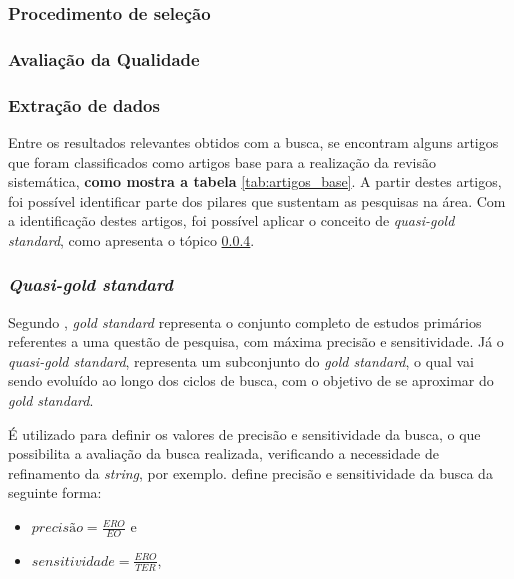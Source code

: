 		\subsubsection{Procedimento de seleção}

		\subsubsection{Avaliação da Qualidade}

		\subsubsection{Extração de dados}

		Entre os resultados relevantes obtidos com a busca, se encontram alguns artigos que foram classificados como artigos base para a realização da revisão sistemática, \textbf{como mostra a tabela} \ref{tab:artigos_base}. A partir destes artigos, foi possível identificar parte dos pilares que sustentam as pesquisas na área.  Com a identificação destes artigos, foi possível aplicar o conceito de \textit{quasi-gold standard}, como apresenta o tópico \ref{sub:quasi-gold}.

		\subsubsection{\textit{Quasi-gold standard}} %
		\label{sub:quasi-gold}

			Segundo \cite{quasi_goldES}, \textit{gold standard} representa o conjunto completo de estudos primários referentes a uma questão de pesquisa, com máxima precisão e sensitividade. Já o \textit{quasi-gold standard}, representa um subconjunto do \textit{gold standard}, o qual vai sendo evoluído ao longo dos ciclos de busca, com o objetivo de se aproximar do \textit{gold standard}. 

			É utilizado para definir os valores de precisão e sensitividade da busca, o que possibilita a avaliação da busca realizada, verificando a necessidade de refinamento da \textit{string}, por exemplo. \cite{quasi_goldES} define precisão e sensitividade da busca da seguinte forma:

			\begin{itemize}

				\item $precisão = \frac{ERO}{EO}$ e

				\item $sensitividade = \frac{ERO}{TER}$,
			\end{itemize}

